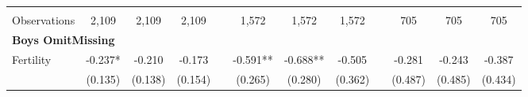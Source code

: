 \begin{landscape}
\begin{table}[htpb!]
\begin{center}
\begin{tabular}{lcccp{2mm}cccp{2mm}ccc}
\begin{footnotesize}\end{footnotesize}&\begin{footnotesize}\end{footnotesize}&\begin{footnotesize}\end{footnotesize}&\begin{footnotesize}\end{footnotesize}&\begin{footnotesize}\end{footnotesize}&\begin{footnotesize}\end{footnotesize}&\begin{footnotesize}\end{footnotesize}&\begin{footnotesize}\end{footnotesize}&\begin{footnotesize}\end{footnotesize}&\begin{footnotesize}\end{footnotesize}&\begin{footnotesize}\end{footnotesize}&\begin{footnotesize}\end{footnotesize}\\Observations&2,109&2,109&2,109&&1,572&1,572&1,572&&705&705&705\\
\multicolumn{12}{l}{\textbf{Boys OmitMissing}}\\ 
Fertility&-0.237*&-0.210&-0.173&&-0.591**&-0.688**&-0.505&&-0.281&-0.243&-0.387\\
&(0.135)&(0.138)&(0.154)&&(0.265)&(0.280)&(0.362)&&(0.487)&(0.485)&(0.434)\\

\end{tabular}
\end{center}
\end{table}
\end{landscape}
